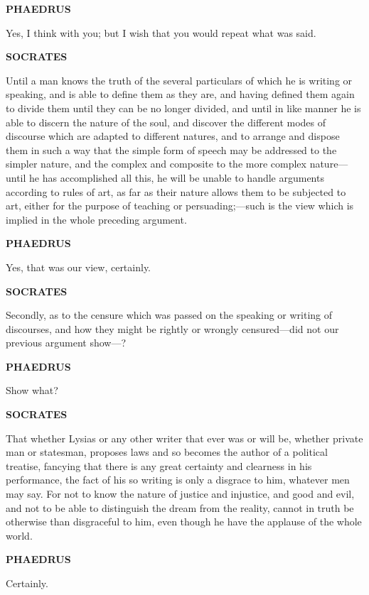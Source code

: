 \documentclass[11pt,letter]{article}
\begin{document}
\par \textbf{PHAEDRUS}
\par   Yes, I think with you; but I wish that you would repeat what was said.

\par \textbf{SOCRATES}
\par   Until a man knows the truth of the several particulars of which he is writing or speaking, and is able to define them as they are, and having defined them again to divide them until they can be no longer divided, and until in like manner he is able to discern the nature of the soul, and discover the different modes of discourse which are adapted to different natures, and to arrange and dispose them in such a way that the simple form of speech may be addressed to the simpler nature, and the complex and composite to the more complex nature—until he has accomplished all this, he will be unable to handle arguments according to rules of art, as far as their nature allows them to be subjected to art, either for the purpose of teaching or persuading;—such is the view which is implied in the whole preceding argument.

\par \textbf{PHAEDRUS}
\par   Yes, that was our view, certainly.

\par \textbf{SOCRATES}
\par   Secondly, as to the censure which was passed on the speaking or writing of discourses, and how they might be rightly or wrongly censured—did not our previous argument show—?

\par \textbf{PHAEDRUS}
\par   Show what?

\par \textbf{SOCRATES}
\par   That whether Lysias or any other writer that ever was or will be, whether private man or statesman, proposes laws and so becomes the author of a political treatise, fancying that there is any great certainty and clearness in his performance, the fact of his so writing is only a disgrace to him, whatever men may say. For not to know the nature of justice and injustice, and good and evil, and not to be able to distinguish the dream from the reality, cannot in truth be otherwise than disgraceful to him, even though he have the applause of the whole world.

\par \textbf{PHAEDRUS}
\par   Certainly.
\end{document}
